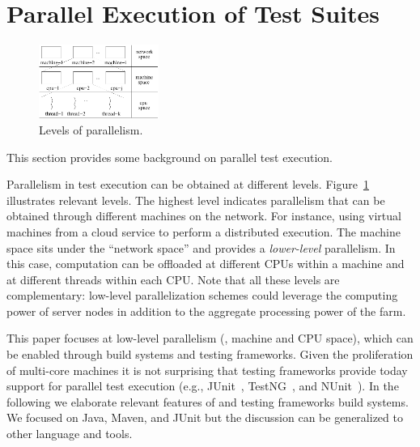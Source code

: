 \newcommand{\Seq}{L0}
\newcommand{\SeqClassParMeth}{L1}
\newcommand{\ParClassSeqMeth}{L2}
\newcommand{\ParClassParMeth}{L3}
\newcommand{\Fork}{F}
\newcommand{\ForkSeq}{\Fork{}\Seq{}}
\newcommand{\ForkParMeth}{\Fork{}\SeqClassParMeth{}}

\section{Parallel Execution of Test Suites}
\label{sec:modes}

\begin{figure}[t!]
  \centering
  \includegraphics[width=0.35\textwidth]{figs/parallel-levels.pdf}
  \vspace{-1ex}
  \caption{\label{fig:levels}Levels of parallelism.}
\end{figure}


This section provides some background on parallel test execution.

Parallelism in test execution can be obtained at different levels.
Figure~\ref{fig:levels} illustrates relevant levels.  The highest
level indicates parallelism that can be obtained through different
machines on the network.  For instance, using virtual machines from a
cloud service to perform a distributed execution.  The machine space
sits under the ``network space'' and provides a \emph{lower-level}
parallelism.  In this case, computation can be offloaded at different
CPUs within a machine and at different threads within each CPU.  Note
that all these levels are complementary:  low-level parallelization
schemes could leverage the computing power of server nodes in addition
to the aggregate processing power of the farm.


This paper focuses at low-level parallelism (\ie, machine and CPU
space), which can be enabled through build systems and testing
frameworks.  Given the proliferation of multi-core machines it is not
surprising that testing frameworks provide today support for parallel
test execution (e.g., JUnit~\cite{junit-org}, TestNG~\cite{testng},
and NUnit~\cite{nunit}).  In the following we elaborate relevant
features of and testing frameworks build systems.  We focused on Java,
Maven, and JUnit but the discussion can be generalized to other
language and tools.

